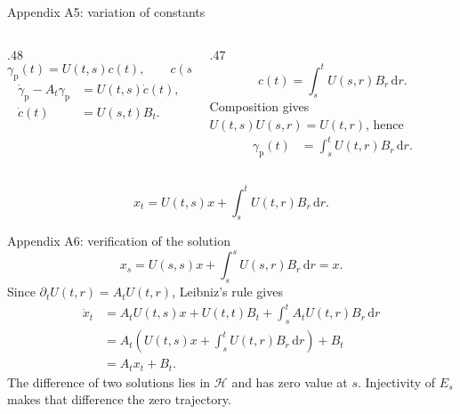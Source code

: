 \begin{frame}[t]{Appendix A5: variation of constants}
\hypertarget{app:variation}{}
\begin{columns}[T,onlytextwidth]
  \begin{column}{.48\textwidth}
    \begin{equation*}
      \gamma_{\mathrm p}(t)=U(t,s)c(t),\qquad c(s)=0.
    \end{equation*}
    \begin{equation*}
      \begin{aligned}
        \dot\gamma_{\mathrm p}-A_t\gamma_{\mathrm p}
          &=U(t,s)\dot c(t),\\
        \dot c(t)&=U(s,t)B_t.
      \end{aligned}
    \end{equation*}
  \end{column}
  \begin{column}{.47\textwidth}
    \begin{equation*}
      c(t)=\int_s^t U(s,r)B_r\,\mathrm dr.
    \end{equation*}
    Composition gives $U(t,s)U(s,r)=U(t,r)$, hence
    \begin{equation*}
      \begin{aligned}
        \gamma_{\mathrm p}(t)
          &=\int_s^t U(t,r)B_r\,\mathrm dr.
      \end{aligned}
    \end{equation*}
  \end{column}
\end{columns}
\medskip
\begin{equation*}
  x_t=U(t,s)x+\int_s^t U(t,r)B_r\,\mathrm dr.
\end{equation*}
\end{frame}

\begin{frame}[t]{Appendix A6: verification of the solution}
\hypertarget{app:verification}{}
\begin{equation*}
  x_s=U(s,s)x+\int_s^s U(s,r)B_r\,\mathrm dr=x.
\end{equation*}
Since $\partial_tU(t,r)=A_tU(t,r)$, Leibniz's rule gives
\begin{equation*}
  \begin{aligned}
    \dot x_t
      &=A_tU(t,s)x+U(t,t)B_t+\int_s^t A_tU(t,r)B_r\,\mathrm dr\\
      &=A_t\left(U(t,s)x+\int_s^t U(t,r)B_r\,\mathrm dr\right)+B_t\\
      &=A_tx_t+B_t.
  \end{aligned}
\end{equation*}
The difference of two solutions lies in $\mathcal H$ and has zero value at $s$.
Injectivity of $E_s$ makes that difference the zero trajectory.
\end{frame}

